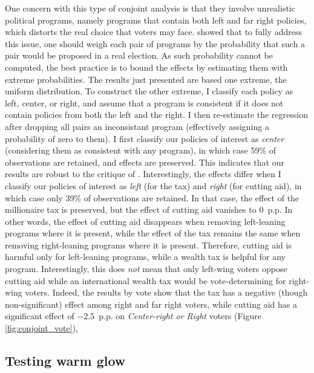 \documentclass[12pt,english]{article}
\begin{document}
\begin{bibunit}
One concern with this type of conjoint analysis is that they involve unrealistic political programs, namely programs that contain both left and far right policies, which distorts the real choice that voters may face. \cite{cuesta_improving_2022} showed that to fully address this issue, one should weigh each pair of programs by the probability that such a pair would be proposed in a real election. As such probability cannot be computed, the best practice is to bound the effects by estimating them with extreme probabilities. The results just presented are based one extreme, the uniform distribution. To construct the other extreme, I classify each policy as left, center, or right, and assume that a program is consistent if it does not contain policies from both the left and the right. I then re-estimate the regression after dropping all pairs an inconsistant program (effectively assigning a probability of zero to them). I first classify our policies of interest as \textit{center} (considering them as consistent with any program), in which case 59\% of observations are retained, and effects are preserved. This indicates that our results are robust to the critique of \cite{cuesta_improving_2022}. Interestingly, the effects differ when I classify our policies of interest as \textit{left} (for the tax) and \textit{right} (for cutting aid), in which case only 39\% of observations are retained. In that case, the effect of the millionaire tax is preserved, but the effect of cutting aid vanishes to 0~p.p. In other words, the effect of cutting aid disappears when removing left-leaning programs where it is present, while the effect of the tax remains the same when removing right-leaning programs where it is present. Therefore, cutting aid is harmful only for left-leaning programs, while a wealth tax is helpful for any program. Interestingly, this does \textit{not} mean that only left-wing voters oppose cutting aid while an international wealth tax would be vote-determining for right-wing voters. %
Indeed, the results by vote show that the tax has a negative (though non-significant) effect among right and far right voters, while cutting aid has a significant effect of $-$2.5~p.p. on \textit{Center-right or Right} voters (Figure \ref{fig:conjoint_vote}), 


\subsection{Testing warm glow}\label{subsec:warm_glow}


\end{bibunit}
\end{document}
